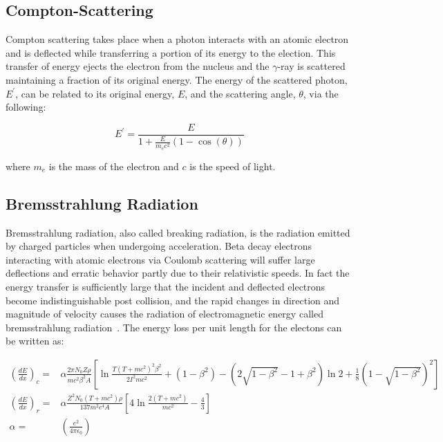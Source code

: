\documentclass[cnatzke_thesis_proposal.tex]{subfiles}
\begin{document}
\subsection{Compton-Scattering}
\label{sec:compton_scatter}

Compton scattering takes place when a photon interacts with an atomic electron and is deflected while transferring a portion of its energy to the election. 
This transfer of energy ejects the electron from the nucleus and the $\gamma$-ray is scattered maintaining a fraction of its original energy. 
The energy of the scattered photon, $E^{'}$, can be related to its original energy, $E$, and the scattering angle, $\theta$, via the following:

\begin{equation}
    E^{'} = \frac{E}{1 + \frac{E}{m_e c^2}(1 - \cos(\theta))}
\end{equation}

where $m_e$ is the mass of the electron and $c$ is the speed of light. 

\subsection{Bremsstrahlung Radiation}
\label{sec:bremsstrahlung_radiation}
Bremsstrahlung radiation, also called breaking radiation, is the radiation emitted by charged particles when undergoing acceleration. 
Beta decay electrons interacting with atomic electrons via Coulomb scattering will suffer large deflections and erratic behavior partly due to their relativistic speeds.
In fact the energy transfer is sufficiently large that the incident and deflected electrons become indistinguishable post collision, and the rapid changes in direction and magnitude of velocity causes the radiation of electromagnetic energy called bremsstrahlung radiation~\cite{krane_introductory_1987}. 
The energy loss per unit length for the electons can be written as: 

\begin{align}
    \left(\frac{dE}{dx}\right)_c ={}& \alpha \frac{2 \pi N_0 Z \rho}{m c^2 \beta^2 A} \left[ \ln \frac{T(T + m c^2)^2 \beta^2}{2 I^2 m c^2} + (1 - \beta^2) - (2\sqrt{1 - \beta^2} - 1 + \beta^2) \ln2 + \frac{1}{8}(1 - \sqrt{1 - \beta^2})^2 \right] \\
    \left(\frac{dE}{dx}\right)_r ={}& \alpha \frac{Z^2 N_0 (T + m c^2) \rho}{137 m^2 c^4 A} \left[4 \ln \frac{2(T + m c^2)}{m c^2} - \frac{4}{3} \right] \\
    \alpha = {}& \left(\frac{e^2}{4 \pi \epsilon_0}\right)
\end{align}
\end{document}
